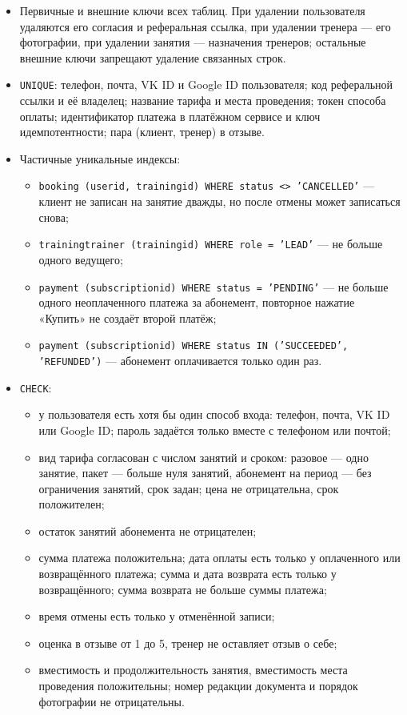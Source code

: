\documentclass[14pt,a4paper]{extarticle}
\renewcommand{\_}{\textunderscore\allowbreak}
\begin{document}
\begin{itemize}
  \item Первичные и внешние ключи всех таблиц. При удалении пользователя удаляются его согласия и реферальная ссылка, при удалении тренера --- его фотографии, при удалении занятия --- назначения тренеров; остальные внешние ключи запрещают удаление связанных строк.
  \item \texttt{UNIQUE}: телефон, почта, VK ID и Google ID пользователя; код реферальной ссылки и её владелец; название тарифа и места проведения; токен способа оплаты; идентификатор платежа в платёжном сервисе и ключ идемпотентности; пара (клиент, тренер) в отзыве.
  \item Частичные уникальные индексы:
  \begin{itemize}
    \item \texttt{booking (user\_id, training\_id) WHERE status <> 'CANCELLED'} --- клиент не записан на занятие дважды, но после отмены может записаться снова;
    \item \texttt{training\_trainer (training\_id) WHERE role = 'LEAD'} --- не больше одного ведущего;
    \item \texttt{payment (subscription\_id) WHERE status = 'PENDING'} --- не больше одного неоплаченного платежа за абонемент, повторное нажатие «Купить» не создаёт второй платёж;
    \item \texttt{payment (subscription\_id) WHERE status IN ('SUCCEEDED', 'REFUNDED')} --- абонемент оплачивается только один раз.
  \end{itemize}
  \item \texttt{CHECK}:
  \begin{itemize}
    \item у пользователя есть хотя бы один способ входа: телефон, почта, VK ID или Google ID; пароль задаётся только вместе с телефоном или почтой;
    \item вид тарифа согласован с числом занятий и сроком: разовое --- одно занятие, пакет --- больше нуля занятий, абонемент на период --- без ограничения занятий, срок задан; цена не отрицательна, срок положителен;
    \item остаток занятий абонемента не отрицателен;
    \item сумма платежа положительна; дата оплаты есть только у оплаченного или возвращённого платежа; сумма и дата возврата есть только у возвращённого; сумма возврата не больше суммы платежа;
    \item время отмены есть только у отменённой записи;
    \item оценка в отзыве от 1 до 5, тренер не оставляет отзыв о себе;
    \item вместимость и продолжительность занятия, вместимость места проведения положительны; номер редакции документа и порядок фотографии не отрицательны.
  \end{itemize}
\end{itemize}
\end{document}
